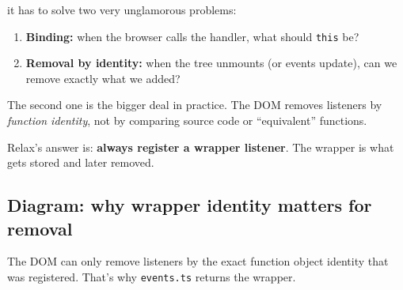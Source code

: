 it has to solve two very unglamorous problems:

\begin{enumerate}
  \item \textbf{Binding:} when the browser calls the handler, what should \texttt{this} be?
  \item \textbf{Removal by identity:} when the tree unmounts (or events update), can we remove exactly what we added?
\end{enumerate}

The second one is the bigger deal in practice.
The DOM removes listeners by \emph{function identity}, not by comparing source code or ``equivalent'' functions.

Relax's answer is: \textbf{always register a wrapper listener}. The wrapper is what gets stored and later removed.

\subsection*{Diagram: why wrapper identity matters for removal}
\begin{center}
\end{center}

The DOM can only remove listeners by the exact function object identity that was registered. That's why \texttt{events.ts} returns the wrapper.

